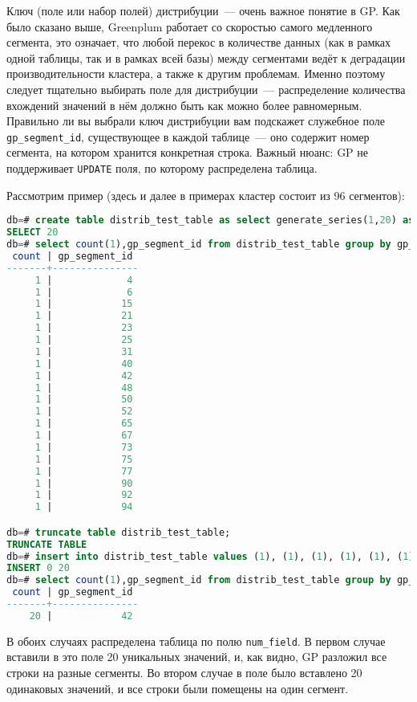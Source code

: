Ключ (поле или набор полей) дистрибуции~--- очень важное понятие в GP. Как было сказано выше, Greenplum работает со скоростью самого медленного сегмента, это означает, что любой перекос в количестве данных (как в рамках одной таблицы, так и в рамках всей базы) между сегментами ведёт к деградации производительности кластера, а также к другим проблемам. Именно поэтому следует тщательно выбирать поле для дистрибуции~--- распределение количества вхождений значений в нём должно быть как можно более равномерным. Правильно ли вы выбрали ключ дистрибуции вам подскажет служебное поле \lstinline!gp_segment_id!, существующее в каждой таблице~--- оно содержит номер сегмента, на котором хранится конкретная строка. Важный нюанс: GP не поддерживает \lstinline!UPDATE! поля, по которому распределена таблица.

Рассмотрим пример (здесь и далее в примерах кластер состоит из 96 сегментов):

\begin{lstlisting}[language=SQL,label=lst:greenplum_example1,caption=Создание распределенной таблицы]
db=# create table distrib_test_table as select generate_series(1,20) as num_field distributed by (num_field);
SELECT 20
db=# select count(1),gp_segment_id from distrib_test_table group by gp_segment_id order by gp_segment_id;
 count | gp_segment_id
-------+---------------
     1 |             4
     1 |             6
     1 |            15
     1 |            21
     1 |            23
     1 |            25
     1 |            31
     1 |            40
     1 |            42
     1 |            48
     1 |            50
     1 |            52
     1 |            65
     1 |            67
     1 |            73
     1 |            75
     1 |            77
     1 |            90
     1 |            92
     1 |            94

db=# truncate table distrib_test_table;
TRUNCATE TABLE
db=# insert into distrib_test_table values (1), (1), (1), (1), (1), (1), (1), (1), (1), (1), (1), (1), (1), (1), (1), (1), (1), (1), (1), (1);
INSERT 0 20
db=# select count(1),gp_segment_id from distrib_test_table group by gp_segment_id order by gp_segment_id;
 count | gp_segment_id
-------+---------------
    20 |            42
\end{lstlisting}

В обоих случаях распределена таблица по полю \lstinline!num_field!. В первом случае вставили в это поле 20 уникальных значений, и, как видно, GP разложил все строки на разные сегменты. Во втором случае в поле было вставлено 20 одинаковых значений, и все строки были помещены на один сегмент.

